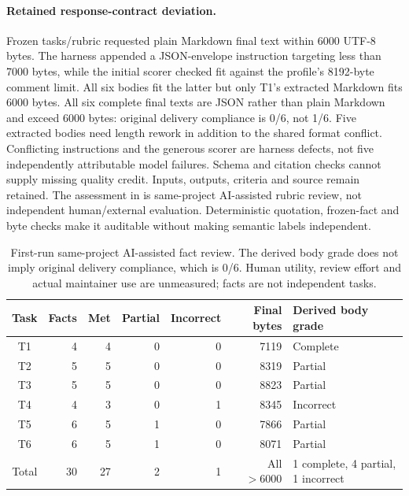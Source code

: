 \documentclass[11pt,letterpaper]{article}
\begin{document}
\paragraph{Retained response-contract deviation.}
Frozen tasks/rubric requested plain Markdown final text within 6000 UTF-8 bytes. The harness
appended a JSON-envelope instruction targeting less than 7000 bytes, while the
initial scorer checked fit against the profile's 8192-byte comment limit.
All six bodies fit the latter but only T1's extracted Markdown fits 6000 bytes.
All six complete final texts are JSON rather than plain Markdown and exceed
6000 bytes: original delivery compliance is 0/6, not 1/6. Five extracted bodies
need length rework in addition to the shared format conflict. Conflicting
instructions and the generous scorer are harness defects, not five independently
attributable model failures. Schema and
citation checks cannot supply missing quality credit. Inputs, outputs, criteria
and source remain retained. The assessment in
 is same-project AI-assisted rubric
review, not independent human/external evaluation. Deterministic quotation,
frozen-fact and byte checks make it auditable without making semantic labels
independent.

\begin{table}[tbp]
\centering\small
\begin{tabular}{@{}crrrrrl@{}}
\toprule Task & Facts & Met & Partial & Incorrect & Final bytes & Derived body grade \\
\midrule
T1 & 4 & 4 & 0 & 0 & 7119 & Complete \\
T2 & 5 & 5 & 0 & 0 & 8319 & Partial \\
T3 & 5 & 5 & 0 & 0 & 8823 & Partial \\
T4 & 4 & 3 & 0 & 1 & 8345 & Incorrect \\
T5 & 6 & 5 & 1 & 0 & 7866 & Partial \\
T6 & 6 & 5 & 1 & 0 & 8071 & Partial \\
\midrule
Total & 30 & 27 & 2 & 1 & All $>6000$ & 1 complete, 4 partial, 1 incorrect \\
\bottomrule
\end{tabular}
\caption{First-run same-project AI-assisted fact review. The derived body grade
does not imply original delivery compliance, which is 0/6. Human utility, review
effort and actual maintainer use are unmeasured; facts are not independent tasks.}
\label{tab:field-review}
\end{table}
\end{document}
